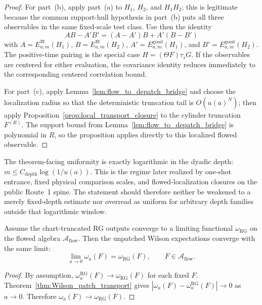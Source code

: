 \begin{proof}
For part~\textup{(b)}, apply part~\textup{(a)} to $H_1$, $H_2$, and $H_1H_2$; this is legitimate because the common support-hull hypothesis in part~\textup{(b)} puts all three observables in the same fixed-scale test class. Use then the identity
\[
AB-A'B'=(A-A')B+A'(B-B')
\]
with $A=E_{a,m}^{\mathrm W}(H_1)$, $B=E_{a,m}^{\mathrm W}(H_2)$, $A'=E_{a,m}^{\mathrm{good}}(H_1)$, and $B'=E_{a,m}^{\mathrm{good}}(H_2)$.
The positive-time pairing is the special case $H=(\Theta F)\tau_s G$.
If the observables are centered for either evaluation, the covariance identity reduces immediately to the corresponding centered correlation bound.

For part~\textup{(c)}, apply Lemma~\ref{lem:flow_to_depatch_bridge} and choose the localization radius so that the deterministic truncation tail is $O(u(a)^N)$; then apply Proposition~\ref{prop:local_transport_closure} to the cylinder truncation $F^{(R)}$. The support bound from Lemma~\ref{lem:flow_to_depatch_bridge} is polynomial in $R$, so the proposition applies directly to this localized flowed observable.
\end{proof}

\begin{remark}
The theorem-facing uniformity is exactly logarithmic in the dyadic depth: $m\le C_{\mathrm{depth}}\log(1/u(a))$. This is the regime later realized by one-shot entrance, fixed physical comparison scales, and flowed-localization closures on the public Route~1 spine. The statement should therefore neither be weakened to a merely fixed-depth estimate nor overread as uniform for arbitrary depth families outside that logarithmic window.
\end{remark}

\begin{lemma}\label{lem:depatch_continuum}
Assume the chart-truncated RG outputs converge to a limiting functional $\omega_{\mathrm{RG}}$ on the flowed algebra $\mathcal A_{\mathrm{flow}}$.
Then the unpatched Wilson expectations converge with the same limit:
\[
\lim_{a\to 0}\omega_a(F)=\omega_{\mathrm{RG}}(F),\qquad F\in\mathcal A_{\mathrm{flow}}.
\]
\end{lemma}

\begin{proof}
By assumption, $\omega_a^{\mathrm{RG}}(F)\to \omega_{\mathrm{RG}}(F)$ for each fixed $F$.
Theorem~\ref{thm:Wilson_patch_transport} gives $|\omega_a(F)-\omega_a^{\mathrm{RG}}(F)|\to 0$ as $a\to0$.
Therefore $\omega_a(F)\to \omega_{\mathrm{RG}}(F)$.
\end{proof}


